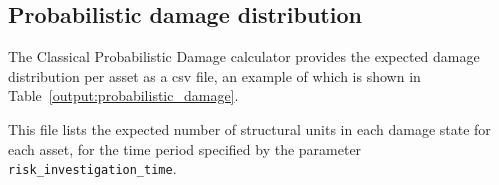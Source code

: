 \subsection{Probabilistic damage distribution}

The Classical Probabilistic Damage calculator provides the expected damage
distribution per asset as a csv file, an example of which is shown in
Table~\ref{output:probabilistic_damage}.



This file lists the expected number of structural units in each damage state
for each \gls{asset}, for the time period specified by the parameter
\Verb+risk_investigation_time+.

